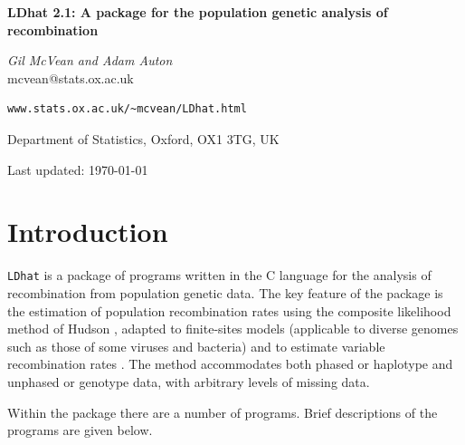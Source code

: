 \documentclass[a4paper,10pt,fullpage]{article}
\begin{document}
\begin{titlepage}

\flushleft

{\Large \bf LDhat 2.1: A package for the population genetic analysis
of recombination\\}

\vspace{1.5cm} {\it Gil McVean and Adam Auton\\}
mcvean@stats.ox.ac.uk\\
\begin{verbatim}
www.stats.ox.ac.uk/~mcvean/LDhat.html
\end{verbatim}

\vspace{0.75cm}
Department of Statistics, Oxford, OX1 3TG, UK\\
\vspace{5.0cm}

Last updated: \today

\end{titlepage}

\tableofcontents

\newpage

\section{Introduction}
\verb+LDhat+ is a package of programs written in the C language for the
analysis of recombination from population genetic data.  The key
feature of the package is the estimation of population
recombination rates using the composite likelihood method of
Hudson \cite{Hudson01}, adapted to finite-sites models (applicable
to diverse genomes such as those of some viruses and bacteria)
\cite{McVeanetal02} and to estimate variable recombination rates
\cite{McVeanetal04, AutonMcVean07}. The method accommodates both phased or
haplotype and unphased or genotype data, with arbitrary levels of
missing data.

Within the package there are a number of programs.  Brief
descriptions of the programs are given below.
\end{document}
